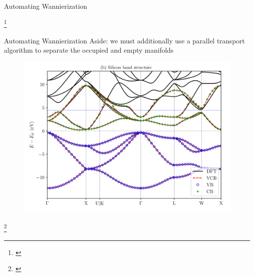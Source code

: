 \documentclass[xcolor=table,aspectratio=169]{beamer}
\newcommand\blfootcite[1]{%
  \begingroup
  \renewcommand\thefootnote{}\footnote{\hspace{-4ex}\cite{#1}}%
  \addtocounter{footnote}{-1}%
  \endgroup
}
\numberwithin{equation}{section}
\begin{document}
\begin{frame}{Automating Wannierization}
\begin{figure}[t]
\begin{subfigure}{0.2\textwidth}
      \end{subfigure}
   \end{figure}

   \blfootcite{Qiao2023}

\end{frame}

\begin{frame}{Automating Wannierization}
   Aside: we must additionally use a parallel transport algorithm to separate the occupied and empty manifolds

      \begin{figure}
         \includegraphics[width=0.3\columnwidth]{figures/target_manifolds_fig1b.png}
      \end{figure}

   \blfootcite{Qiao2023a}

\end{frame}
\end{document}
